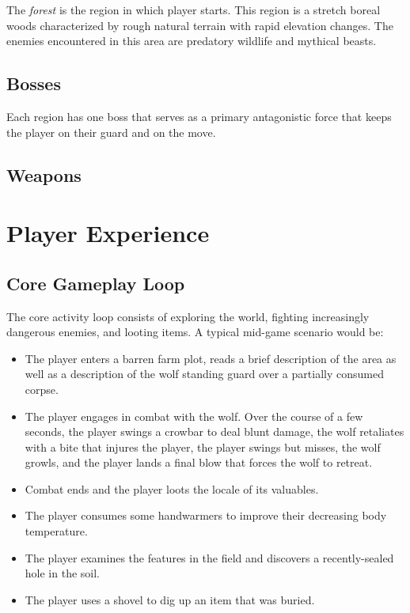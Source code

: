 \documentclass[11pt]{article}
\begin{document}
	The \textit{forest} is the region in which player starts. This region is a stretch boreal woods characterized by rough natural terrain with rapid elevation changes. The enemies encountered in this area are predatory wildlife and mythical beasts.
	
	\subsection{Bosses}
	
	Each region has one boss that serves as a primary antagonistic force that keeps the player on their guard and on the move.
	
	\subsection{Weapons}
	
	\section{Player Experience}
	\subsection{Core Gameplay Loop}
	
	The core activity loop consists of exploring the world, fighting increasingly dangerous enemies, and looting items. A typical mid-game scenario would be:
	
	\begin{itemize}
		\item The player enters a barren farm plot, reads a brief description of the area as well as a description of the wolf standing guard over a partially consumed corpse.
		\item The player engages in combat with the wolf. Over the course of a few seconds, the player swings a crowbar to deal blunt damage, the wolf retaliates with a bite that injures the player, the player swings but misses, the wolf growls, and the player lands a final blow that forces the wolf to retreat.
		\item Combat ends and the player loots the locale of its valuables.
		\item The player consumes some handwarmers to improve their decreasing body temperature.
		\item The player examines the features in the field and discovers a recently-sealed hole in the soil.
		\item The player uses a shovel to dig up an item that was buried.
	\end{itemize}
	
\end{document}
